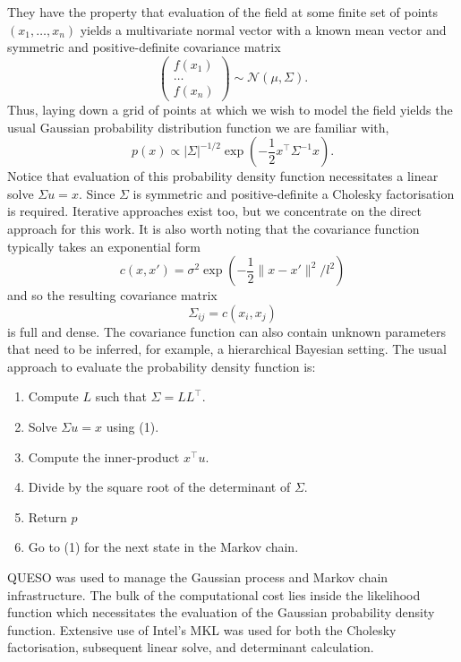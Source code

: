 They have the property that evaluation of the field at some finite set of
points $(x_1, \ldots, x_n)$ yields a multivariate normal vector with a known
mean vector and symmetric and positive-definite covariance matrix
\begin{equation}
  \begin{pmatrix}
    f(x_1) \\
    \hdots \\
    f(x_n)
  \end{pmatrix}
  \sim \mathcal{N}(\mu, \Sigma).
\end{equation}
Thus, laying down a grid of points at which we wish to model the field yields
the usual Gaussian probability distribution function we are familiar with,
\begin{equation}
  p(x) \propto |\Sigma|^{-1/2} \exp(-\frac12 x^\top \Sigma^{-1} x).
\end{equation}
Notice that evaluation of this probability density function necessitates a
linear solve $\Sigma u = x$.  Since $\Sigma$ is symmetric and positive-definite
a Cholesky factorisation is required.  Iterative approaches exist too, but we
concentrate on the direct approach for this work.  It is also worth noting that the
covariance function typically takes an exponential form
\begin{equation}
  c(x, x') = \sigma^2 \exp(-\frac12 \| x - x' \|^2 / l^2)
\end{equation}
and so the resulting covariance matrix
\begin{equation}
  \Sigma_{ij} = c(x_i, x_j)
\end{equation}
is full and dense.  The covariance function can also contain
unknown parameters 
that need to be inferred, for example, a hierarchical
Bayesian setting.  The usual approach to evaluate the
probability density function is: 
\begin{enumerate}
  \item Compute $L$ such that $\Sigma = LL^\top$.
  \item Solve $\Sigma u = x$ using (1).
  \item Compute the inner-product $x^\top u$.
  \item Divide by the square root of the determinant of $\Sigma$.
  \item Return $p$
  \item Go to (1) for the next state in the Markov chain.
\end{enumerate}

QUESO was used to manage the Gaussian process and Markov chain infrastructure.
The bulk of the computational cost lies inside the likelihood function which
necessitates the evaluation of the Gaussian probability density function.
Extensive use of Intel's MKL was used for both the Cholesky factorisation,
subsequent linear solve, and determinant calculation.

